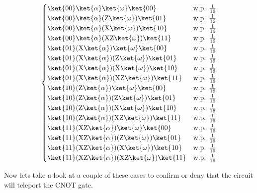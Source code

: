 \documentclass[]{article}
\begin{document}
\begin{enumerate}
        \[
          \begin{cases}
          \ket{00}\ket{\alpha}\ket{\omega}\ket{00} & \text{w.p. } \frac{1}{16}\\
          \ket{00}\ket{\alpha}(\text{Z} \ket{\omega})\ket{01} & \text{w.p. } \frac{1}{16}\\
          \ket{00}\ket{\alpha}(\text{X} \ket{\omega})\ket{10} & \text{w.p. } \frac{1}{16}\\ 
          \ket{00}\ket{\alpha}(\text{XZ} \ket{\omega})\ket{11} & \text{w.p. } \frac{1}{16}\\
          \ket{01}(\text{X}\ket{\alpha})\ket{\omega}\ket{00} & \text{w.p. } \frac{1}{16}\\
          \ket{01}(\text{X}\ket{\alpha})(\text{Z} \ket{\omega})\ket{01} & \text{w.p. } \frac{1}{16}\\
          \ket{01}(\text{X}\ket{\alpha})(\text{X} \ket{\omega})\ket{10} & \text{w.p. } \frac{1}{16}\\
          \ket{01}(\text{X}\ket{\alpha})(\text{XZ} \ket{\omega})\ket{11} & \text{w.p. } \frac{1}{16}\\
          \ket{10}(\text{Z}\ket{\alpha})\ket{\omega}\ket{00} & \text{w.p. } \frac{1}{16}\\
          \ket{10}(\text{Z}\ket{\alpha})(\text{Z} \ket{\omega})\ket{01} & \text{w.p. } \frac{1}{16}\\
          \ket{10}(\text{Z}\ket{\alpha})(\text{X} \ket{\omega})\ket{10} & \text{w.p. } \frac{1}{16}\\
          \ket{10}(\text{Z}\ket{\alpha})(\text{XZ} \ket{\omega})\ket{11} & \text{w.p. } \frac{1}{16}\\
          \ket{11}(\text{XZ}\ket{\alpha})\ket{\omega}\ket{00} & \text{w.p. } \frac{1}{16}\\
          \ket{11}(\text{XZ}\ket{\alpha})(\text{Z} \ket{\omega})\ket{01} & \text{w.p. } \frac{1}{16}\\
          \ket{11}(\text{XZ}\ket{\alpha})(\text{X} \ket{\omega})\ket{10} & \text{w.p. } \frac{1}{16}\\
          \ket{11}(\text{XZ}\ket{\alpha})(\text{XZ} \ket{\omega})\ket{11}& \text{w.p. } \frac{1}{16}\\
          \end{cases}
        \]
        

        Now lets take a look at a couple of these cases to confirm or deny that the circuit will teleport the CNOT gate. 


\end{enumerate}
\end{document}
